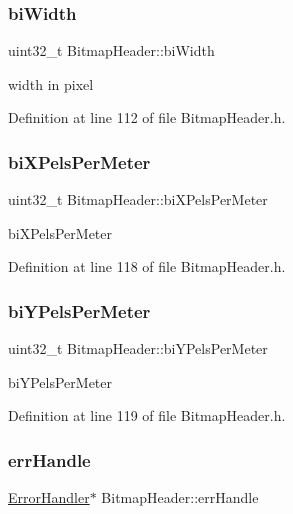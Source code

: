 \subsubsection{\texorpdfstring{biWidth}{biWidth}}
{\footnotesize\ttfamily uint32\+\_\+t Bitmap\+Header\+::bi\+Width\hspace{0.3cm}{\ttfamily [private]}}

width in pixel 

Definition at line 112 of file Bitmap\+Header.\+h.

\mbox{\label{classBitmapHeader_a1569e156f59c8a939c9d4b668ae41bcd}} 
\subsubsection{\texorpdfstring{biXPelsPerMeter}{biXPelsPerMeter}}
{\footnotesize\ttfamily uint32\+\_\+t Bitmap\+Header\+::bi\+X\+Pels\+Per\+Meter\hspace{0.3cm}{\ttfamily [private]}}

bi\+X\+Pels\+Per\+Meter 

Definition at line 118 of file Bitmap\+Header.\+h.

\mbox{\label{classBitmapHeader_a9f029a3b36773c4da51c18e0453213c7}} 
\subsubsection{\texorpdfstring{biYPelsPerMeter}{biYPelsPerMeter}}
{\footnotesize\ttfamily uint32\+\_\+t Bitmap\+Header\+::bi\+Y\+Pels\+Per\+Meter\hspace{0.3cm}{\ttfamily [private]}}

bi\+Y\+Pels\+Per\+Meter 

Definition at line 119 of file Bitmap\+Header.\+h.

\mbox{\label{classBitmapHeader_ab06f141245d592302dabe48571d12e32}} 
\subsubsection{\texorpdfstring{errHandle}{errHandle}}
{\footnotesize\ttfamily \mbox{\hyperlink{classErrorHandler}{Error\+Handler}}$\ast$ Bitmap\+Header\+::err\+Handle\hspace{0.3cm}{\ttfamily [private]}}

